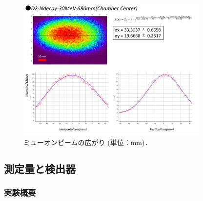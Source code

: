 \begin{figure}[H]
\centering
\includegraphics[width=0.85\textwidth]{figure/hayakawa/profile.pdf}
\caption{ミューオンビームの広がり (単位：$\mathrm{mm}$)．}
\label{muon2}
\end{figure}

\subsection{測定量と検出器}

\subsubsection{実験概要}

